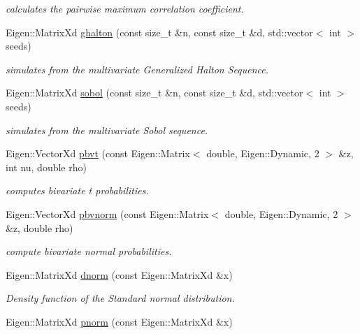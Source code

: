 \begin{DoxyCompactItemize}
\begin{DoxyCompactList}\small\item\em calculates the pairwise maximum correlation coefficient. \end{DoxyCompactList}\item 
Eigen\+::\+Matrix\+Xd \hyperlink{namespacevinecopulib_1_1tools__stats_a96499e20cf7b24c504b8d160fe753e05}{ghalton} (const size\+\_\+t \&n, const size\+\_\+t \&d, std\+::vector$<$ int $>$ seeds)
\begin{DoxyCompactList}\small\item\em simulates from the multivariate Generalized Halton Sequence. \end{DoxyCompactList}\item 
Eigen\+::\+Matrix\+Xd \hyperlink{namespacevinecopulib_1_1tools__stats_a9a8c8331b2eb372a4ad8a3808b4847ab}{sobol} (const size\+\_\+t \&n, const size\+\_\+t \&d, std\+::vector$<$ int $>$ seeds)
\begin{DoxyCompactList}\small\item\em simulates from the multivariate Sobol sequence. \end{DoxyCompactList}\item 
Eigen\+::\+Vector\+Xd \hyperlink{namespacevinecopulib_1_1tools__stats_a1e81bac0b4e1e9e0158b800a7db0d1af}{pbvt} (const Eigen\+::\+Matrix$<$ double, Eigen\+::\+Dynamic, 2 $>$ \&z, int nu, double rho)
\begin{DoxyCompactList}\small\item\em computes bivariate t probabilities. \end{DoxyCompactList}\item 
Eigen\+::\+Vector\+Xd \hyperlink{namespacevinecopulib_1_1tools__stats_a6867eea2d193c7e5d78b30b9991397ad}{pbvnorm} (const Eigen\+::\+Matrix$<$ double, Eigen\+::\+Dynamic, 2 $>$ \&z, double rho)
\begin{DoxyCompactList}\small\item\em compute bivariate normal probabilities. \end{DoxyCompactList}\item 
Eigen\+::\+Matrix\+Xd \hyperlink{namespacevinecopulib_1_1tools__stats_a249880b93e82211207869f94821de440}{dnorm} (const Eigen\+::\+Matrix\+Xd \&x)
\begin{DoxyCompactList}\small\item\em Density function of the Standard normal distribution. \end{DoxyCompactList}\item 
Eigen\+::\+Matrix\+Xd \hyperlink{namespacevinecopulib_1_1tools__stats_aa380a12540c4749e14049cdd0b163352}{pnorm} (const Eigen\+::\+Matrix\+Xd \&x)

\end{DoxyCompactItemize}
